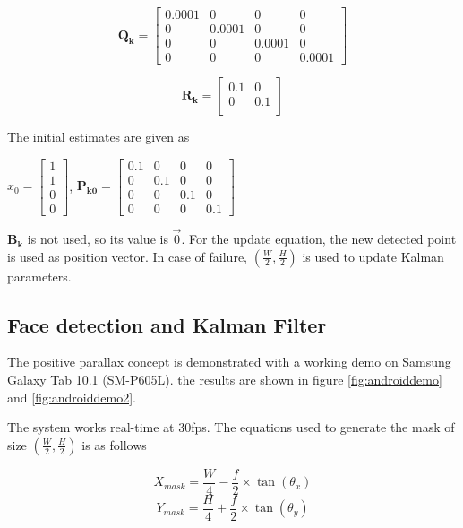 \documentclass[12pt,twocolumn,letterpaper]{article}
\begin{document}
$$ \mathbf{Q_k} = \begin{bmatrix}
0.0001 & 0 & 0 & 0\\
0 & 0.0001 & 0 & 0\\
0 & 0 & 0.0001 & 0\\
0 & 0 & 0 & 0.0001
\end{bmatrix} $$

$$ \mathbf{R_k} = \begin{bmatrix}
0.1 & 0 \\
0 & 0.1\\
\end{bmatrix} $$

The initial estimates are given as

$ \hat{x}_{0} = \begin{bmatrix}
1\\1\\0\\0
\end{bmatrix} $,
$ \mathbf{P_{k0}} = \begin{bmatrix}
0.1 & 0 & 0 & 0\\
0 & 0.1 & 0 & 0\\
0 & 0 & 0.1 & 0\\
0 & 0 & 0 & 0.1
\end{bmatrix} $

$\mathbf{B_k}$ is not used, so its value is $\vec{0}$. For the update equation, the new detected point is used as position vector. In case of failure, $(\frac{W}{2}, \frac{H}{2})$ is used to update Kalman parameters.

\subsection{Face detection and Kalman Filter}
The positive parallax concept is demonstrated with a working demo on Samsung Galaxy Tab 10.1 (SM-P605L). the results are shown in figure \ref{fig:androiddemo} and \ref{fig:androiddemo2}. 


The system works real-time at 30fps. The equations used to generate the mask of size $(\frac{W}{2}, \frac{H}{2})$ is as follows

\begin{equation}
	X_{mask} = \frac{W}{4} - \frac{f}{2} \times \tan(\theta_x)
\end{equation}
\begin{equation}
	Y_{mask} = \frac{H}{4} + \frac{f}{2} \times \tan(\theta_y)
\end{equation}
\end{document}
